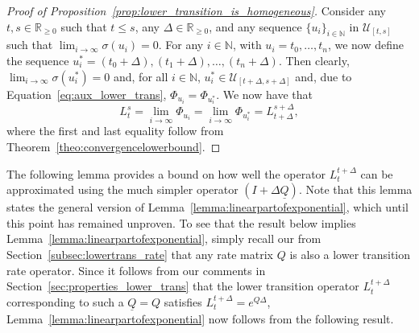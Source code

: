 \documentclass[10pt,a4paper]{paper}
\theoremstyle{definition}
\newcommand{\nats}{\mathbb{N}}
\newcommand{\reals}{\mathbb{R}}
\newcommand{\realsnonneg}{\reals_{\geq 0}}
\newcommand{\lrate}{\underline{Q}}
\begin{document}
\begin{proof}[Proof of Proposition~\ref{prop:lower_transition_is_homogeneous}]
Consider any $t,s\in\realsnonneg$ such that $t\leq s$, any $\Delta\in\realsnonneg$, and any sequence $\{u_i\}_{i\in\nats}$ in $\mathcal{U}_{[t,s]}$ such that $\lim_{i\to\infty}\sigma(u_i)=0$. %
For any $i\in\nats$, with $u_i=t_0,\ldots,t_n$, we now define the sequence $u_i^*=(t_0+\Delta),(t_1+\Delta),\ldots,(t_n+\Delta)$. Then clearly, $\lim_{i\to\infty}\sigma(u_i^*)=0$ and, for all $i\in\nats$, $u_i^*\in\mathcal{U}_{[t+\Delta,s+\Delta]}$ and, due to Equation~\eqref{eq:aux_lower_trans}, $\Phi_{u_i}=\Phi_{u_i^*}$.
We now have that
\begin{equation*}
L_t^s=\lim_{i\to\infty}\Phi_{u_i}=\lim_{i\to\infty}\Phi_{u_i^*}=L_{t+\Delta}^{s+\Delta},
\end{equation*}
where the first and last equality follow from Theorem~\ref{theo:convergencelowerbound}.
\end{proof}

The following lemma provides a bound on how well the operator $L_t^{t+\Delta}$ can be approximated using the much simpler operator $(I+\Delta\lrate)$. Note that this lemma states the general version of Lemma~\ref{lemma:linearpartofexponential}, which until this point has remained unproven. To see that the result below implies Lemma~\ref{lemma:linearpartofexponential}, simply recall our from Section~\ref{subsec:lowertrans_rate} that any rate matrix $Q$ is also a lower transition rate operator. Since it follows from our comments in Section~\ref{sec:properties_lower_trans} that the lower transition operator $L_t^{t+\Delta}$ corresponding to such a $\lrate=Q$ satisfies $L_t^{t+\Delta}=e^{Q\Delta}$, Lemma~\ref{lemma:linearpartofexponential} now follows from the following result.
\end{document}
